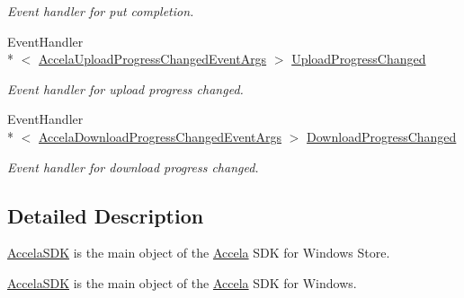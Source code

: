 \begin{DoxyCompactItemize}
\begin{DoxyCompactList}\small\item\em Event handler for put completion. \end{DoxyCompactList}\item 
Event\+Handler\\*
$<$ \hyperlink{class_accela_1_1_windows_store_s_d_k_1_1_accela_upload_progress_changed_event_args}{Accela\+Upload\+Progress\+Changed\+Event\+Args} $>$ \hyperlink{class_accela_1_1_windows_store_s_d_k_1_1_accela_s_d_k_a724988be0528fd8b906ef1bdd49571d7}{Upload\+Progress\+Changed}
\begin{DoxyCompactList}\small\item\em Event handler for upload progress changed. \end{DoxyCompactList}\item 
Event\+Handler\\*
$<$ \hyperlink{class_accela_1_1_windows_store_s_d_k_1_1_accela_download_progress_changed_event_args}{Accela\+Download\+Progress\+Changed\+Event\+Args} $>$ \hyperlink{class_accela_1_1_windows_store_s_d_k_1_1_accela_s_d_k_aa6cf2bc41f9604cb30881e19196fcfdc}{Download\+Progress\+Changed}
\begin{DoxyCompactList}\small\item\em Event handler for download progress changed. \end{DoxyCompactList}\end{DoxyCompactItemize}


\subsection{Detailed Description}
\hyperlink{class_accela_1_1_windows_store_s_d_k_1_1_accela_s_d_k}{Accela\+S\+D\+K} is the main object of the \hyperlink{namespace_accela}{Accela} S\+D\+K for Windows Store. 

\hyperlink{class_accela_1_1_windows_store_s_d_k_1_1_accela_s_d_k}{Accela\+S\+D\+K} is the main object of the \hyperlink{namespace_accela}{Accela} S\+D\+K for Windows. 

